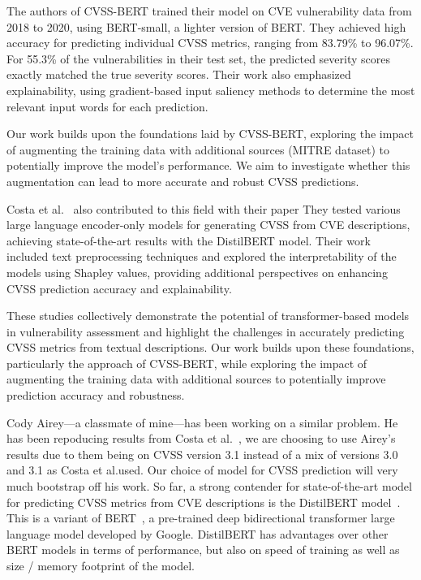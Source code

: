\documentclass[12pt]{article}
\begin{document}
The authors of CVSS-BERT trained their model on CVE vulnerability data from 2018 to 2020, using
BERT-small, a lighter version of BERT. They achieved high accuracy for predicting individual CVSS
metrics, ranging from 83.79\% to 96.07\%. For 55.3\% of the vulnerabilities in their test set, the
predicted severity scores exactly matched the true severity scores. Their work also emphasized
explainability, using gradient-based input saliency methods to determine the most relevant input
words for each prediction.

Our work builds upon the foundations laid by CVSS-BERT, exploring the impact of augmenting the
training data with additional sources (MITRE dataset) to potentially improve the model's
performance. We aim to investigate whether this augmentation can lead to more accurate and robust
CVSS predictions.

Costa et al.~\cite{costa} also contributed to this field with their paper  They tested various large language encoder-only models for
generating CVSS from CVE descriptions, achieving state-of-the-art results with the DistilBERT model.
Their work included text preprocessing techniques and explored the interpretability of the models
using Shapley values, providing additional perspectives on enhancing CVSS prediction accuracy and
explainability.

These studies collectively demonstrate the potential of transformer-based models in vulnerability
assessment and highlight the challenges in accurately predicting CVSS metrics from textual
descriptions. Our work builds upon these foundations, particularly
the approach of CVSS-BERT, while exploring the impact of augmenting the training data with
additional sources to potentially improve prediction accuracy and robustness.

Cody Airey---a classmate of mine---has been working on a similar problem. He has been repoducing
results from Costa et al.\@~\cite{costa}, we are choosing to use Airey's results due to them being on
CVSS version 3.1 instead of a mix of versions 3.0 and 3.1 as Costa et al.\@ used. Our choice of model
for CVSS prediction will very much bootstrap off his work. So far, a strong contender for
state-of-the-art model for predicting CVSS metrics from CVE descriptions is the DistilBERT
model~\cite{distilbert}. This is a variant of BERT~\cite{BERT}, a pre-trained deep bidirectional
transformer large language model developed by Google. DistilBERT has advantages over other BERT
models in terms of performance, but also on speed of training as well as size / memory footprint of
the model.
\end{document}
